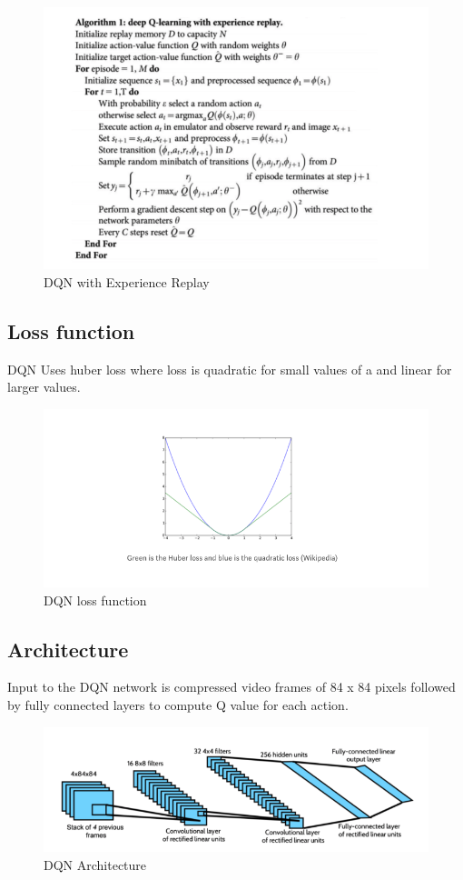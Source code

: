 \begin{figure}%
\centering
\includegraphics[width=0.6\columnwidth]{figures/DQN-ExperinceReplay.png}%
\caption{DQN with Experience Replay}%
\label{fig:datastats}%
\end{figure}


\subsection{Loss function}


DQN Uses huber loss where loss is quadratic for small values of a and linear for larger values.


\begin{figure}%
\centering
\includegraphics[width=0.6\columnwidth]{figures/loss-function.png}%
\caption{DQN loss function}%
\label{fig:datastats}%
\end{figure}


\subsection{Architecture}

Input to the DQN network is compressed video frames of 84 x 84 pixels followed by fully connected layers to compute Q value for each action.

\begin{figure}%
\centering
\includegraphics[width=0.6\columnwidth]{figures/DQN-architecture.png}%
\caption{DQN Architecture}%
\label{fig:datastats}%
\end{figure}




